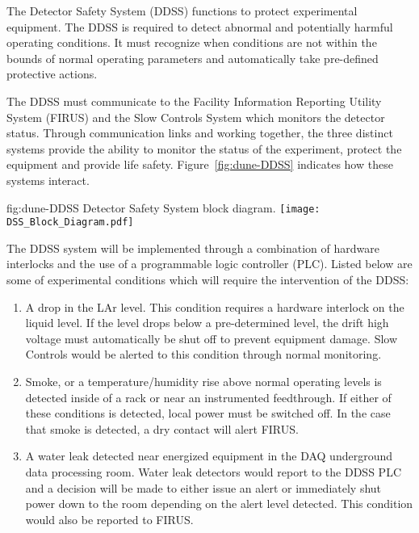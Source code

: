 The  Detector Safety System (DDSS) functions to protect
experimental equipment.  The DDSS is required to detect abnormal and
potentially harmful operating conditions.  It must recognize when
conditions are not within the bounds of normal operating parameters
and automatically take pre-defined protective actions.


The DDSS must communicate to the \surf Facility Information
Reporting Utility System (FIRUS) and the  Slow Controls
System which monitors the detector status.  Through communication
links and working together, the three distinct systems provide the
ability to monitor the status of the experiment, protect the equipment
and provide life safety. Figure~\ref{fig:dune-DDSS} indicates how
these systems interact.
\begin{dunefigure}{fig:dune-DDSS}
  {Detector Safety System block diagram.}
  \texttt{[image: DSS\_Block\_Diagram.pdf]}
\end{dunefigure}


The DDSS system will be implemented through a combination of
hardware interlocks and the use of a programmable logic controller
(PLC).  Listed below are some of  experimental conditions which
will require the intervention of the DDSS:
\begin{enumerate}
 \item A drop in the LAr level.  This condition requires a hardware
   interlock on the liquid level.  If the level drops below a
   pre-determined level, the drift high voltage must automatically be
   shut off to prevent equipment damage.  Slow Controls would be
   alerted to this condition through normal monitoring.
 \item Smoke, or a temperature/humidity rise above normal operating
   levels is detected inside of a rack or near an instrumented
   feedthrough.  If either of these conditions is detected, local
   power must be switched off. In the case that smoke is detected, a
   dry contact will alert FIRUS.
 \item A water leak detected near energized equipment in the DAQ
   underground data processing room.  Water leak detectors would
   report to the DDSS PLC and a decision will be made to either
   issue an alert or immediately shut power down to the room depending
   on the alert level detected.  This condition would also be reported
   to FIRUS.
\end{enumerate}
  
